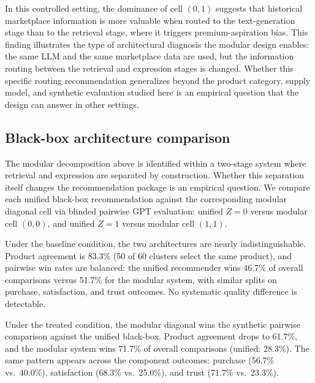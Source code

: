 \documentclass[11pt]{article}
\begin{document}
In this controlled setting, the dominance of cell $(0,1)$ suggests that historical marketplace information is more valuable when routed to the text-generation stage than to the retrieval stage, where it triggers premium-aspiration bias. This finding illustrates the type of architectural diagnosis the modular design enables: the same LLM and the same marketplace data are used, but the information routing between the retrieval and expression stages is changed. Whether this specific routing recommendation generalizes beyond the product category, supply model, and synthetic evaluation studied here is an empirical question that the design can answer in other settings.

\subsection{Black-box architecture comparison}\label{section:bb-diagnostic}

The modular decomposition above is identified within a two-stage system where retrieval and expression are separated by construction. Whether this separation itself changes the recommendation package is an empirical question. We compare each unified black-box recommendation against the corresponding modular diagonal cell via blinded pairwise GPT evaluation: unified $Z=0$ versus modular cell $(0,0)$, and unified $Z=1$ versus modular cell $(1,1)$.

Under the baseline condition, the two architectures are nearly indistinguishable. Product agreement is 83.3\% (50 of 60 clusters select the same product), and pairwise win rates are balanced: the unified recommender wins 46.7\% of overall comparisons versus 51.7\% for the modular system, with similar splits on purchase, satisfaction, and trust outcomes. No systematic quality difference is detectable.

Under the treated condition, the modular diagonal wins the synthetic pairwise comparison against the unified black-box. Product agreement drops to 61.7\%, and the modular system wins 71.7\% of overall comparisons (unified: 28.3\%). The same pattern appears across the component outcomes: purchase (56.7\% vs.\ 40.0\%), satisfaction (68.3\% vs.\ 25.0\%), and trust (71.7\% vs.\ 23.3\%).
\end{document}
